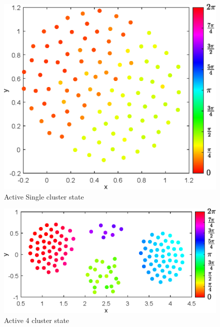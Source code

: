 \documentclass[twocolumn,10pt]{asme2ej}
\begin{document}
{\begin{figure}[h!]
        \includegraphics[width = \linewidth]{ActiveSingle.eps}
        \caption{Active Single cluster state}
    \end{figure}
    \begin{figure}
        \includegraphics[width = \linewidth]{Active4Clust.eps}
        \caption{Active 4 cluster state}
    \end{figure}
}
\end{document}
